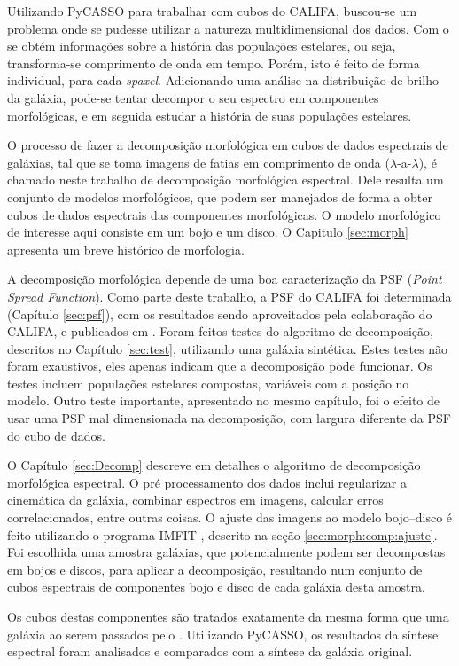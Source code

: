 Utilizando PyCASSO para trabalhar com cubos do CALIFA, buscou-se um problema
onde se pudesse utilizar a natureza multidimensional dos dados. Com o \starlight
se obtém informações sobre a história das populações estelares, ou seja,
transforma-se comprimento de onda em tempo. Porém, isto é feito de forma
individual, para cada {\em spaxel}. Adicionando uma análise na distribuição de
brilho da galáxia, pode-se tentar decompor o seu espectro em componentes
morfológicas, e em seguida estudar a história de suas populações estelares.

O processo de fazer a decomposição morfológica em cubos de dados espectrais de
galáxias, tal que se toma imagens de fatias em comprimento de onda
($\lambda$-a-$\lambda$), é chamado neste trabalho de decomposição morfológica
espectral. Dele resulta um conjunto de modelos morfológicos, que podem ser
manejados de forma a obter cubos de dados espectrais das componentes
morfológicas. O modelo morfológico de interesse aqui consiste em um bojo e um
disco. O Capitulo \ref{sec:morph} apresenta um breve histórico de morfologia.

A decomposição morfológica depende de uma boa caracterização da PSF ({\em Point
Spread Function}). Como parte deste trabalho, a PSF do CALIFA foi determinada
(Capítulo \ref{sec:psf}), com os resultados sendo aproveitados pela colaboração
do CALIFA, e publicados em \citet{GarciaBenito2015}. Foram feitos testes do
algoritmo de decomposição, descritos no Capítulo \ref{sec:test}, utilizando uma
galáxia sintética. Estes testes não foram exaustivos, eles apenas indicam que a
decomposição pode funcionar. Os testes incluem populações estelares compostas,
variáveis com a posição no modelo. Outro teste importante, apresentado no mesmo
capítulo, foi o efeito de usar uma PSF mal dimensionada na decomposição, com
largura diferente da PSF do cubo de dados.

O Capítulo \ref{sec:Decomp} descreve em detalhes o algoritmo de decomposição
morfológica espectral. O pré processamento dos dados inclui regularizar a
cinemática da galáxia, combinar espectros em imagens, calcular erros
correlacionados, entre outras coisas. O ajuste das imagens ao modelo bojo--disco
é feito utilizando o programa IMFIT \citep{Erwin2015}, descrito na seção
\ref{sec:morph:comp:ajuste}. Foi escolhida uma amostra galáxias, que
potencialmente podem ser decompostas em bojos e discos, para aplicar a
decomposição, resultando num conjunto de cubos espectrais de componentes bojo e
disco de cada galáxia desta amostra.

Os cubos destas componentes são tratados exatamente da mesma forma que uma
galáxia ao serem passados pelo \starlight. Utilizando PyCASSO, os
resultados da síntese espectral foram analisados e comparados com a síntese da
galáxia original.


